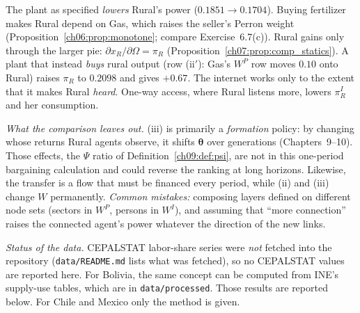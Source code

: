 \documentclass[../solutions_manual.tex]{subfiles}
\begin{document}
The plant as specified \emph{lowers} Rural's power ($0.1851 \to 0.1704$). Buying fertilizer makes Rural depend on Gas, which raises the seller's Perron weight (Proposition~\ref{ch06:prop:monotone}; compare Exercise~6.7(c)). Rural gains only through the larger pie: $\partial x_R/\partial\Omega = \pi_R$ (Proposition~\ref{ch07:prop:comp_statics}). A plant that instead \emph{buys} rural output (row (ii$'$): Gas's $W^P$ row moves $0.10$ onto Rural) raises $\pi_R$ to $0.2098$ and gives $+0.67$. The internet works only to the extent that it makes Rural \emph{heard}. One-way access, where Rural listens more, lowers $\pi^I_R$ and her consumption.

\emph{What the comparison leaves out.} (iii) is primarily a \emph{formation} policy: by changing whose returns Rural agents observe, it shifts $\boldsymbol{\theta}$ over generations (Chapters~9--10). Those effects, the $\Psi$ ratio of Definition~\ref{ch09:def:psi}, are not in this one-period bargaining calculation and could reverse the ranking at long horizons. Likewise, the transfer is a flow that must be financed every period, while (ii) and (iii) change $W$ permanently. \emph{Common mistakes:} composing layers defined on different node sets (sectors in $W^P$, persons in $W^I$), and assuming that ``more connection'' raises the connected agent's power whatever the direction of the new links.


\emph{Status of the data.} CEPALSTAT labor-share series were \emph{not} fetched into the repository (\texttt{data/README.md} lists what was fetched), so no CEPALSTAT values are reported here. For Bolivia, the same concept can be computed from INE's supply-use tables, which are in \texttt{data/processed}. Those results are reported below. For Chile and Mexico only the method is given.
\end{document}
